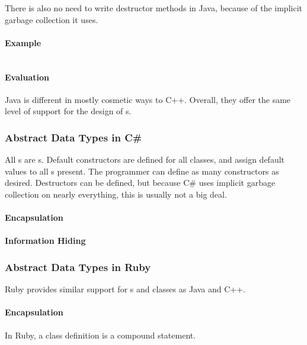 There is also no need to write destructor methods in Java, because of the implicit garbage collection it uses.

\paragraph{Example}\label{par:Java_Abstract_Data_Type_Example}
\inputminted[frame=lines,linenos]{java}{./EDAP05-Concepts_Programming_Languages-Sections/Abstract_Data_Types/Code/Class_Example-Stack-Java.java}

\paragraph{Evaluation}\label{par:Java_Abstract_Data_Type_Evaluation}
Java is different in mostly cosmetic ways to C++.
Overall, they offer the same level of support for the design of s.

\subsubsection{Abstract Data Types in C\#}\label{subsubsec:Abstract_Data_Types_CSharp}
All s are s.
Default constructors are defined for all classes, and assign default values to all  s present.
The programmer can define as many constructors as desired.
Destructors can be defined, but because C\# uses implicit garbage collection on nearly everything, this is usually not a big deal.

\paragraph{Encapsulation}\label{par:Objective_C_Encapsulation}
\paragraph{Information Hiding}\label{par:Objective_C_Info_Hiding}

\subsubsection{Abstract Data Types in Ruby}\label{subsubsec:Abstract_Data_Types_Ruby}
Ruby provides similar support for s and classes as Java and C++.

\paragraph{Encapsulation}\label{par:Ruby_Encapsulation}
In Ruby, a class definition is a compound statement.

